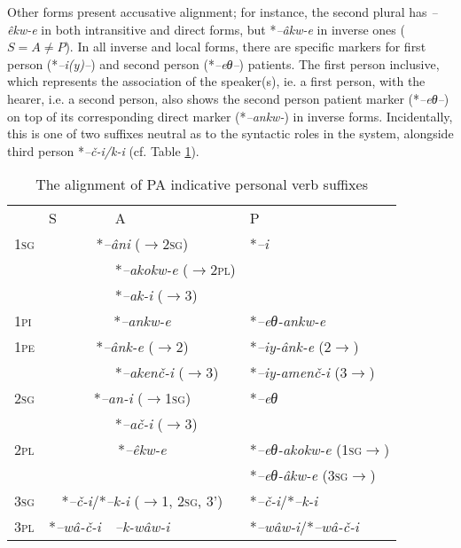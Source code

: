 \documentclass[twoside,a4paper,11pt]{article}
\newcommand{\ipa}[1]{{\phon\textit{#1}}}
\newcommand{\sg}{\textsc{sg}}
\newcommand{\pl}{\textsc{pl}}
\newcommand{\Σ}{\greek{Σ}}
\newcommand{\pli}{\textsc{pi}}
\newcommand{\pe}{\textsc{pe}}
\begin{document}
Other forms present accusative alignment; for instance, the second plural has \ipa{--êkw-e} in both intransitive and direct forms, but *\ipa{--âkw-e}  in inverse ones ($S = A \ne P$). In all inverse and local forms, there are specific markers for first person (*\ipa{--i(y)--}) and second person (*\ipa{--eθ--}) patients. The first person inclusive, which represents the association of the speaker(s), ie. a first person, with the hearer, i.e. a second person, also shows the second person patient marker (*\ipa{--eθ--}) on top of its corresponding direct marker (*\ipa{--ankw-}) in inverse forms. Incidentally, this is one of two suffixes neutral as to the syntactic roles in the system, alongside third person *\ipa{--č-i/k-i} (cf. Table \ref{tab:protoalg.align}).


\begin{table}[H]
\caption{The alignment of PA indicative personal verb suffixes}
\centering \label{tab:protoalg.align}
\begin{tabular}{llll}
\toprule
& S & A & P\\
1\sg & \multicolumn{2}{c}{*\ipa{--âni} ($\rightarrow$2\sg)}\hspace{1.5cm} & *\ipa{--i}\\
 & & *\ipa{--akokw-e} ($\rightarrow$2\pl) &\\
& & *\ipa{--ak-i} ($\rightarrow$3) &\\
1\pli & \multicolumn{2}{c}{*\ipa{--ankw-e}}\hspace{2.2cm} & *\ipa{--eθ-ankw-e}\\
1\pe & \multicolumn{2}{c}{*\ipa{--ânk-e}  ($\rightarrow$2)} \hspace{1.5cm} & *\ipa{--iy-ânk-e} (2$\rightarrow$)\\
& & *\ipa{--akenč-i}  ($\rightarrow$3)& *\ipa{--iy-amenč-i} (3$\rightarrow$) \\
\midrule
2\sg & \multicolumn{2}{c}{*\ipa{--an-i} ($\rightarrow$1\sg)}\hspace{1.5cm} & *\ipa{--eθ}\\
&&*\ipa{--ač-i} ($\rightarrow$3) &\\
2\pl & \multicolumn{2}{c}{*\ipa{--êkw-e}}\hspace{2.5cm} & *\ipa{--eθ-akokw-e}  (1\sg$\rightarrow$) \\
& & & *\ipa{--eθ-âkw-e}  (3\sg$\rightarrow$)\\
\midrule
3\sg & \multicolumn{2}{c}{*\ipa{--č-i}/*\ipa{--k-i} ($\rightarrow$1, 2\sg, 3')}\hspace{0.5cm} & *\ipa{--č-i}/*\ipa{--k-i}\\
3\pl & *\ipa{--wâ-č-i} & \ipa{--k-wâw-i} & *\ipa{--wâw-i}/*\ipa{--wâ-č-i}  \\
\bottomrule
\end{tabular}
\end{table}
\end{document}
